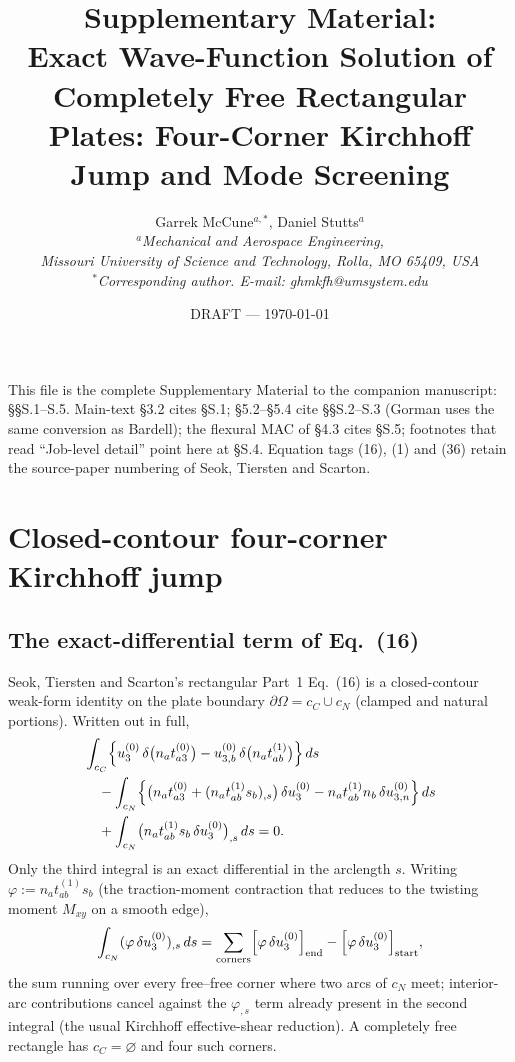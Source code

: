 \documentclass[11pt]{article}
\title{\bfseries Supplementary Material:\\
Exact Wave-Function Solution of Completely Free Rectangular Plates:
Four-Corner Kirchhoff Jump and Mode Screening}
\author{Garrek McCune$^{a,*}$, Daniel Stutts$^{a}$\\
\small\itshape $^a$Mechanical and Aerospace Engineering,\\
Missouri University of Science and Technology, Rolla, MO 65409, USA\\
\small\upshape $^*$Corresponding author. E-mail: ghmkfh@umsystem.edu}
\date{DRAFT --- \today}
\begin{document}
\maketitle

\noindent
This file is the complete Supplementary Material to the companion
manuscript: \S\S{}S.1--S.5. Main-text \S3.2 cites \S{}S.1; \S5.2--\S5.4 cite
\S\S{}S.2--S.3 (Gorman uses the same conversion as Bardell); the flexural
MAC of \S4.3 cites \S{}S.5; footnotes that read ``Job-level detail'' point
here at \S{}S.4.
Equation tags (16), (1) and (36) retain the source-paper numbering of
Seok, Tiersten and Scarton.

\section{Closed-contour four-corner Kirchhoff jump}\label{sec:sm-corner}

\subsection{The exact-differential term of Eq.~(16)}\label{sec:sm-eq16}
Seok, Tiersten and Scarton's rectangular Part~1 Eq.~(16) is a
closed-contour weak-form identity on the plate boundary
$\partial\Omega=c_C\cup c_N$ (clamped and natural portions). Written out
in full,
\begin{equation}
\begin{aligned}
&\int_{c_C}\Bigl\{u_3^{(0)}\,\delta\bigl(n_a t_{a3}^{(0)}\bigr)
  - u_{3,b}^{(0)}\,\delta\bigl(n_a t_{ab}^{(1)}\bigr)\Bigr\}\,ds \\
&\quad-\int_{c_N}\Bigl\{\bigl(n_a t_{a3}^{(0)}+(n_a t_{ab}^{(1)} s_b)_{,s}\bigr)\,
  \delta u_3^{(0)} - n_a t_{ab}^{(1)} n_b\,\delta u_{3,n}^{(0)}\Bigr\}\,ds \\
&\quad+\int_{c_N}\bigl(n_a t_{ab}^{(1)} s_b\,\delta u_3^{(0)}\bigr)_{,s}\,ds = 0 .
\end{aligned}
\label{eq:sm-16}
\end{equation}
Only the third integral is an exact differential in the arclength $s$.
Writing $\varphi := n_a t_{ab}^{(1)} s_b$ (the traction-moment contraction
that reduces to the twisting moment $M_{xy}$ on a smooth edge),
\begin{equation}
\int_{c_N}(\varphi\,\delta u_3^{(0)})_{,s}\,ds
= \sum_{\mathrm{corners}}\Bigl[\varphi\,\delta u_3^{(0)}\Bigr]_{\mathrm{end}}
  - \Bigl[\varphi\,\delta u_3^{(0)}\Bigr]_{\mathrm{start}},
\label{eq:sm-phi}
\end{equation}
the sum running over every free--free corner where two arcs of $c_N$
meet; interior-arc contributions cancel against the $\varphi_{,s}$ term
already present in the second integral (the usual Kirchhoff
effective-shear reduction). A completely free rectangle has
$c_C=\varnothing$ and four such corners.
\end{document}
